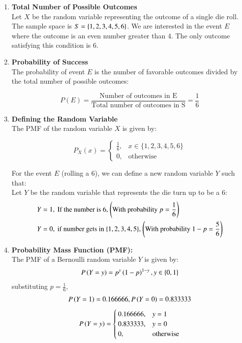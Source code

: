\documentclass[journal]{IEEEtran}
\numberwithin{equation}{enumi}
\numberwithin{figure}{enumi}
\begin{document}
\begin{enumerate}
    \item \textbf{Total Number of Possible Outcomes}\\
    Let $X$ be the random variable representing the outcome of a single die roll. The sample space is $ S = \left\{1, 2, 3, 4, 5, 6\right\}$.  We are interested in the event $E$ where the outcome is an even number greater than 4.  The only outcome satisfying this condition is 6.

    \item \textbf{Probability of Success}\\
    The probability of event $E$ is the number of favorable outcomes divided by the total number of possible outcomes:

$$P(E) = \frac{\text{Number of outcomes in E}}{\text{Total number of outcomes in S}} = \frac{1}{6}$$
    \item \textbf{Defining the Random Variable}\\
    The PMF of the random variable $X$ is given by:

$$P_X(x) = \begin{cases}
    \frac{1}{6}, & x \in \{1, 2, 3, 4, 5, 6\} \\
    0, & \text{otherwise}
\end{cases}$$

For the event $E$ (rolling a 6), we can define a new random variable $Y$ such that:\\
    Let $Y$ be the random variable that represents the die turn up to be a 6:
    \begin{align}
        Y &= 1, \text{ If the number is 6, \ensuremath{\left(\text{With probability }p = \frac{1}{6}\right)}}\\
        Y &= 0, \text{ if number gets in \ensuremath{\left\{1,2,3,4,5\right\}}, \ensuremath{\left(\text{With probability } 1 -p = \frac{5}{6}\right)}}
    \end{align}
    \item \textbf{Probability Mass Function (PMF):}\\
    The PMF  of a Bernoulli random variable $Y$ is given by:
    \begin{align}
	P\left(Y = y\right) = p^y\left(1 - p\right)^{1 - y}, y \in \left\{0,1\right\}
    \end{align}
    substituting $p = \frac{1}{6}$,\\
    \begin{align}
     P\left(Y = 1\right) = 0.166666, P\left(Y = 0\right) = 0.833333
    \end{align}
    \begin{align}
    	P\left(Y = y\right) = \begin{cases}
    		0.166666, & y = 1 \\
    		0.833333, & y = 0 \\
    		0, & \text{otherwise}
    	\end{cases}
    \end{align}


\end{enumerate}
\end{document}

